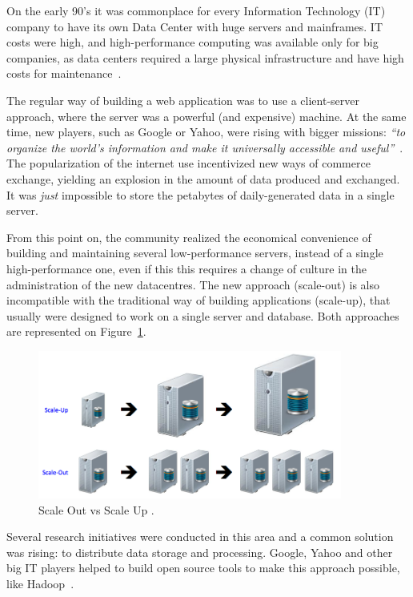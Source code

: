 On the early 90's it was commonplace for every Information Technology (IT) company to have its own Data Center with huge servers and mainframes. 
IT costs were high, and high-performance computing was available only for big companies, as data centers required a large physical infrastructure and have high costs for maintenance~\cite{Armbrust09m.:above}.

The regular way of building a web application was to use a client-server approach, where the server was a powerful (and expensive) machine. 
At the same time, new players, such as Google or Yahoo, were rising with bigger missions: \textit{``to organize the world's information and make it universally accessible and useful''}~\cite{Spector:2012:GHA:2209249.2209262}. 
The popularization of the internet use incentivized new ways of commerce exchange, yielding an explosion in the amount of data produced and exchanged. 
It was \textit{just} impossible to store the petabytes of daily-generated data in a single server. 

From this point on, the community realized the economical convenience of building and maintaining several low-performance servers, instead of a single high-performance one, even if this this requires a change of culture in the administration of the new datacentres. The new approach (scale-out) is also incompatible with the traditional way of building applications (scale-up), that usually were designed to work on a single server and database. Both approaches are represented on Figure~\ref{fig:scaleupout}.

\begin{figure}[ht!]
\centering
\includegraphics[width=100mm]{scaleOut.png}
\caption{Scale Out vs Scale Up \cite{scaleupref}.\label{fig:scaleupout}}
\end{figure}


Several research initiatives were conducted in this area and a common solution was rising: to distribute data storage and processing. 
Google, Yahoo and other big IT players helped to build open source tools to make this approach possible, like Hadoop~\cite{5496972}.



